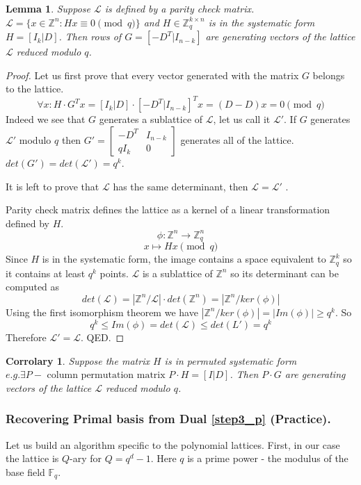 \documentclass[12pt]{article}
\newcommand{\FF}{\mathbb{F}}
\newcommand{\ZZ}{\mathbb{Z}}
\newcommand{\LL}{\mathcal{L}}
\newtheorem{lemma}{Lemma}
\newtheorem{corrolary}{Corrolary}
\begin{document}
\begin{lemma}\label{coolfact}
    Suppose $\LL$ is defined by a parity check matrix. $\LL = \{x \in \ZZ^{n}: Hx \equiv 0 \pmod{q}\}$ and $H \in \ZZ_{q}^{k \times n}$ is in the systematic form $H = [I_{k}| D]$. Then rows of $G = [-D^{T}| I_{n-k}]$ are generating vectors of the lattice $\LL$ reduced modulo $q$.
\end{lemma}
\begin{proof}
Let us first prove that every vector generated with the matrix $G$ belongs to the lattice.
\[
\forall x: H \cdot G^{T}x = [I_{k}|D] \cdot [-D^{T}| I_{n-k}]^{T}x = (D - D)x = 0 \pmod{q}
\]
Indeed we see that $G$ generates a sublattice of $\LL$, let us call it $\LL'$. If $G$ generates $\LL'$ modulo $q$ then
$
G' = \left[ \begin{array}{c|c} -D^{T} & I_{n-k} \\ \hline qI_k & 0 \end{array}\right]
$
generates all of the lattice. $det(G') = det(\LL') = q^{k}$.

It is left to prove that $\LL$ has the same determinant, then $\LL= \LL'$ .

Parity check matrix defines the lattice as a kernel of a linear transformation defined by $H$.
\[
    \phi: \ZZ^{n} \rightarrow \ZZ_q^{n}
\]
\[
    x \mapsto Hx \pmod{q}
\]
Since $H$ is in the systematic form, the image contains a space equivalent to $\ZZ_{q}^{k}$ so it contains at least $q^{k}$ points. $\LL$ is a sublattice of $\ZZ^{n}$ so its determinant can be computed as
\[
    det(\LL) = |\ZZ^{n}/\LL| \cdot det(\ZZ^{n}) = |\ZZ^{n}/ker(\phi)|
\]
Using the first isomorphism theorem we have $|\ZZ^{n}/ker(\phi)| = |Im(\phi)| \geq q^{k}$. So
\[
    q^{k} \leq Im(\phi) = det(\LL) \leq det(L') = q^{k}
\]
Therefore $\LL' = \LL$. QED.
\end{proof}

\begin{corrolary}
Suppose the matrix $H$ is in permuted systematic form $e.g. \exists P - \text{ column permutation matrix } P \cdot H = [I | D]$. Then $P \cdot G$ are generating vectors of the lattice $\LL$ reduced modulo $q$.
\end{corrolary}
\subsubsection{Recovering Primal basis from Dual \ref{step3_p} (Practice).}
\label{subsubsec:primal_from_dual_pr_polynomials}

Let us build an algorithm specific to the polynomial lattices. First, in our case the lattice is $Q$-ary for $Q = q^{d} -1$. Here $q$ is a prime power - the modulus of the base field $\FF_{q}$.
\end{document}
